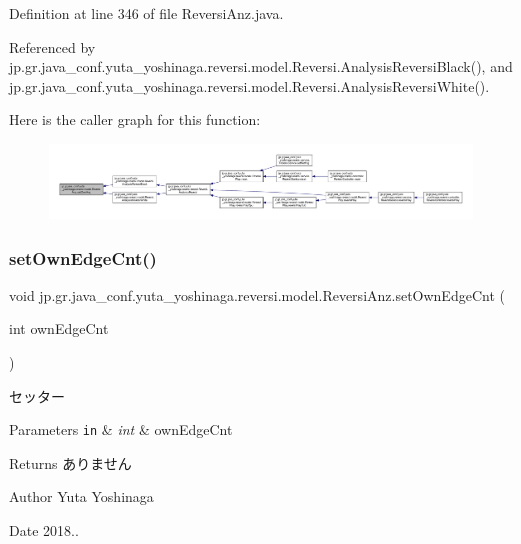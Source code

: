 Definition at line 346 of file Reversi\+Anz.\+java.



Referenced by jp.\+gr.\+java\+\_\+conf.\+yuta\+\_\+yoshinaga.\+reversi.\+model.\+Reversi.\+Analysis\+Reversi\+Black(), and jp.\+gr.\+java\+\_\+conf.\+yuta\+\_\+yoshinaga.\+reversi.\+model.\+Reversi.\+Analysis\+Reversi\+White().

Here is the caller graph for this function\+:
\nopagebreak
\begin{figure}[H]
\begin{center}
\leavevmode
\includegraphics[width=350pt]{classjp_1_1gr_1_1java__conf_1_1yuta__yoshinaga_1_1reversi_1_1model_1_1_reversi_anz_a61cdd5fd8811fdfb3b91ec0deee28e00_icgraph}
\end{center}
\end{figure}
\mbox{\label{classjp_1_1gr_1_1java__conf_1_1yuta__yoshinaga_1_1reversi_1_1model_1_1_reversi_anz_a6003ce46230d00dee3f83489000f1942}} 
\subsubsection{\texorpdfstring{set\+Own\+Edge\+Cnt()}{setOwnEdgeCnt()}}
{\footnotesize\ttfamily void jp.\+gr.\+java\+\_\+conf.\+yuta\+\_\+yoshinaga.\+reversi.\+model.\+Reversi\+Anz.\+set\+Own\+Edge\+Cnt (\begin{DoxyParamCaption}\item[{int}]{own\+Edge\+Cnt }\end{DoxyParamCaption})}



セッター 


\begin{DoxyParams}[1]{Parameters}
\mbox{\tt in}  & {\em int} & own\+Edge\+Cnt \\
\hline
\end{DoxyParams}
\begin{DoxyReturn}{Returns}
ありません 
\end{DoxyReturn}
\begin{DoxyAuthor}{Author}
Yuta Yoshinaga 
\end{DoxyAuthor}
\begin{DoxyDate}{Date}
2018.. 
\end{DoxyDate}


